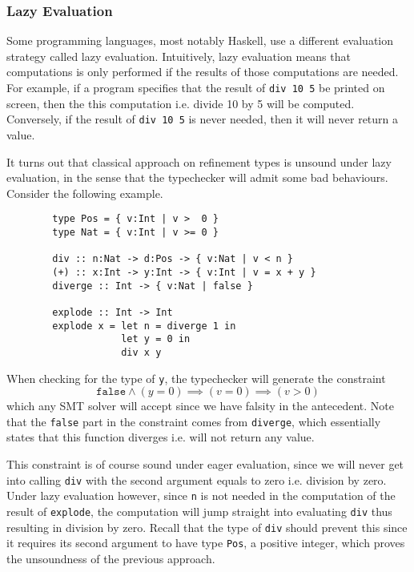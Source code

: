 \documentclass[a4paper,UKenglish]{lipics-v2016}
\begin{document}
    \subsubsection{Lazy Evaluation}

      Some programming languages, most notably Haskell, use a different
      evaluation strategy called lazy evaluation.  Intuitively, lazy evaluation
      means that computations is only performed if the results of those
      computations are needed.  For example, if a program specifies that the
      result of \texttt{div 10 5} be printed on screen, then the this
      computation i.e. divide 10 by 5 will be computed.  Conversely, if the
      result of \texttt{div 10 5} is never needed, then it will never return a
      value.  

      It turns out that classical approach on refinement types is unsound under
      lazy evaluation, in the sense that the typechecker will admit some bad
      behaviours.  Consider the following example.
      \begin{verbatim}
        type Pos = { v:Int | v >  0 }
        type Nat = { v:Int | v >= 0 }

        div :: n:Nat -> d:Pos -> { v:Nat | v < n } 
        (+) :: x:Int -> y:Int -> { v:Int | v = x + y }
        diverge :: Int -> { v:Nat | false } 

        explode :: Int -> Int
        explode x = let n = diverge 1 in 
                    let y = 0 in 
                    div x y
      \end{verbatim}

      When checking for the type of \texttt{y}, the typechecker will generate
      the constraint
      $$\mathtt{false}\wedge(y=0)\implies(v=0)\implies(v>0)$$
      which any SMT solver will accept since we have falsity in the antecedent.
      Note that the \texttt{false} part in the constraint comes from
      \texttt{diverge}, which essentially states that this function diverges
      i.e. will not return any value.

      This constraint is of course sound under eager evaluation, since we will
      never get into calling \texttt{div} with the second argument equals to
      zero i.e. division by zero.  Under lazy evaluation however, since
      \texttt{n} is not needed in the computation of the result of
      \texttt{explode}, the computation will jump straight into evaluating
      \texttt{div} thus resulting in division by zero.  Recall that the type of
      \texttt{div} should prevent this since it requires its second argument to
      have type \texttt{Pos}, a positive integer, which proves the unsoundness
      of the previous approach.
\end{document}
